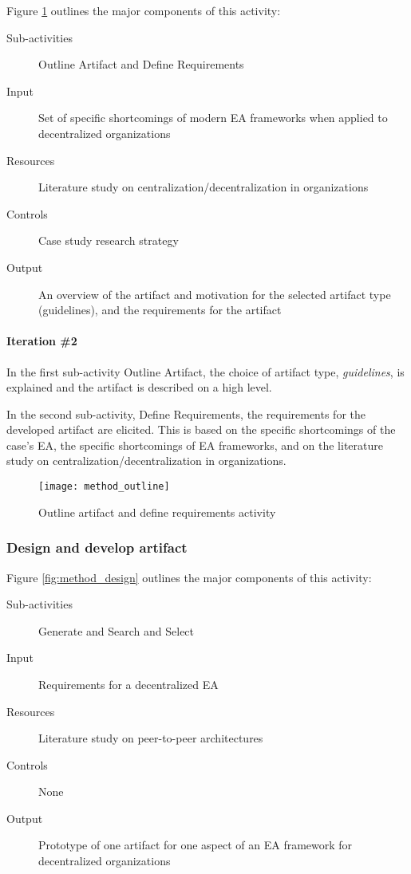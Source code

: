 Figure \ref{fig:method_outline} outlines the major components of this activity:
\begin{description}
  \item[Sub-activities] Outline Artifact and Define Requirements~\cite[Ch. 6]{johannessonPerjons2012}
  \item[Input] Set of specific shortcomings of modern EA frameworks when applied to decentralized organizations
  \item[Resources] Literature study on centralization/decentralization in  organizations
  \item[Controls] Case study research strategy
  \item[Output] An overview of the artifact and motivation for the selected artifact type (guidelines), and the requirements for the artifact
\end{description}

\paragraph{Iteration \#2}

In the first sub-activity Outline Artifact, the choice of artifact type, \textit{guidelines}, is explained and the artifact is described on a high level.

In the second sub-activity, Define Requirements, the requirements for the developed artifact are elicited. This is based on the specific shortcomings of the case's EA, the specific shortcomings of EA frameworks, and on the literature study on centralization/decentralization in organizations.


\begin{figure}
\texttt{[image: method\_outline]}
\caption{Outline artifact and define requirements activity}
\label{fig:method_outline}
\end{figure}

\subsubsection*{Design and develop artifact}

Figure \ref{fig:method_design} outlines the major components of this activity:
\begin{description}
  \item[Sub-activities] Generate and Search and Select~\cite[Ch. 7]{johannessonPerjons2012}
  \item[Input]  Requirements for a decentralized EA 
  \item[Resources] Literature study on peer-to-peer architectures
  \item[Controls] None
  \item[Output] Prototype of one artifact for one aspect of an EA framework for decentralized organizations 
\end{description}

